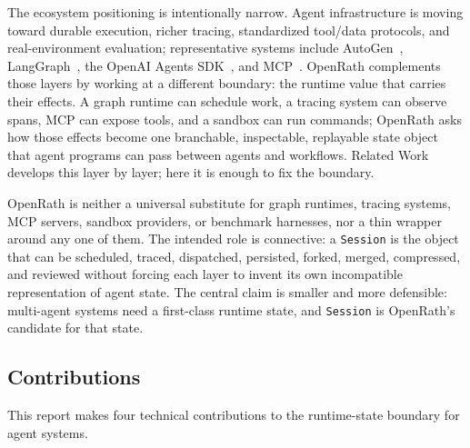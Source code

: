 \documentclass{llmxive}
\begin{document}
The ecosystem positioning is intentionally narrow. Agent infrastructure is
moving toward durable execution, richer tracing, standardized tool/data
protocols, and real-environment evaluation; representative systems include
AutoGen~\cite{autogen}, LangGraph~\cite{langgraph-persistence}, the OpenAI
Agents SDK~\cite{openai-agents-tracing}, and MCP~\cite{mcp-docs,anthropic-mcp}.
OpenRath complements those layers by working at a different boundary: the
runtime value that carries their effects. A graph runtime can schedule work, a
tracing system can observe spans, MCP can expose tools, and a sandbox can run
commands; OpenRath asks how those effects become one branchable, inspectable,
replayable state object that agent programs can pass between agents and
workflows. Related Work develops this layer by layer; here it is enough to fix
the boundary.

OpenRath is neither a universal substitute for graph runtimes, tracing systems, MCP servers, sandbox providers, or benchmark harnesses, nor a thin wrapper around any one of them. The intended role is connective: a \texttt{Session} is the object that can
be scheduled, traced, dispatched, persisted, forked, merged, compressed, and
reviewed without forcing each layer to invent its own incompatible
representation of agent state. The central claim is smaller and more defensible:
multi-agent systems need a first-class runtime state, and \texttt{Session} is
OpenRath's candidate for that state.


\subsection{Contributions}

This report makes four technical contributions to the runtime-state boundary
for agent systems.
\end{document}
